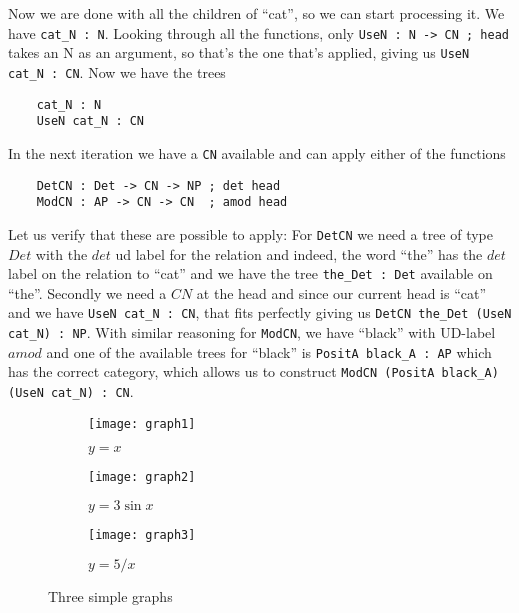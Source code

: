 
Now we are done with all the children of ``cat'', so we can start processing it. We have \lstinline|cat_N : N|. Looking through all the functions, only \lstinline|UseN : N -> CN ; head| takes an N as an argument, so that's the one that's applied, giving us \lstinline|UseN cat_N : CN|. Now we have the trees
\begin{lstlisting}
    cat_N : N
    UseN cat_N : CN
\end{lstlisting}
In the next iteration we have a \lstinline|CN| available and can apply either of the functions
\begin{lstlisting}
    DetCN : Det -> CN -> NP ; det head
    ModCN : AP -> CN -> CN  ; amod head
\end{lstlisting}
Let us verify that these are possible to apply: For \lstinline|DetCN| we need a tree of type $Det$ with the $det$ ud label for the relation and indeed, the word ``the'' has the $det$ label on the relation to ``cat'' and we have the tree \lstinline|the_Det : Det| available on ``the''. Secondly we need a $CN$ at the head and since our current head is ``cat'' and we have \lstinline|UseN cat_N : CN|, that fits perfectly giving us \lstinline|DetCN the_Det (UseN cat_N) : NP|. With similar reasoning for \lstinline{ModCN}, we have ``black'' with UD-label $amod$ and one of the available trees for ``black'' is \lstinline|PositA black_A : AP| which has the correct category, which allows us to construct \lstinline|ModCN (PositA black_A) (UseN cat_N) : CN|.

\begin{figure}
     \centering
     \begin{subfigure}[b]{0.3\textwidth}
         \centering
         \texttt{[image: graph1]}
         \caption{$y=x$}
         \label{fig:y equals x}
     \end{subfigure}
     \hfill
     \begin{subfigure}[b]{0.3\textwidth}
         \centering
         \texttt{[image: graph2]}
         \caption{$y=3\sin x$}
         \label{fig:three sin x}
     \end{subfigure}
     \hfill
     \begin{subfigure}[b]{0.3\textwidth}
         \centering
         \texttt{[image: graph3]}
         \caption{$y=5/x$}
         \label{fig:five over x}
     \end{subfigure}
        \caption{Three simple graphs}
        \label{fig:three graphs}
\end{figure}


